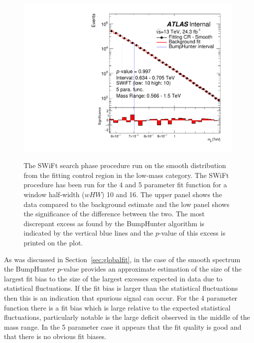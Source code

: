\begin{figure}[!htb]
 {
  \includegraphics[width=0.45\linewidth, angle=0]{figs/Dibjet/LowMass/FitStudy_min566/bhFit_corrFitCR_smooth_5para_low10_high10.pdf}
}
\vspace{10pt}
\caption{\label{fig:bhFit_lm_corrFitCR_smooth}
  The SWiFt search phase procedure run on the smooth distribution from the fitting control region in the low-mass category.
  The SWiFt procedure has been run for the 4 and 5 parameter fit function for a window half-width ($wHW$) 10 and 16.
  The upper panel shows the data compared to the background estimate and the low panel shows the significance of the difference between the two.
  The most discrepant excess as found by the {\sc BumpHunter} algorithm is indicated by the vertical blue lines and the \mbox{$p$-value} of this excess is printed on the plot. }
\end{figure}

As was discussed in Section~\ref{sec:globalfit}, in the case of the smooth spectrum the {\sc BumpHunter} \mbox{$p$-value} provides an approximate estimation
of the size of the largest fit bias to the size of the largest excesses expected in data due to statistical fluctuations.
If the fit bias is larger than the statistical fluctuations then this is an indication that spurious signal can occur. 
For the 4 parameter function there is a fit bias which is large relative to the expected statistical fluctuations,
particularly notable is the large deficit observed in the middle of the mass range.
In the 5 parameter case it appears that the fit quality is good and that there is no obvious fit biases.
 
